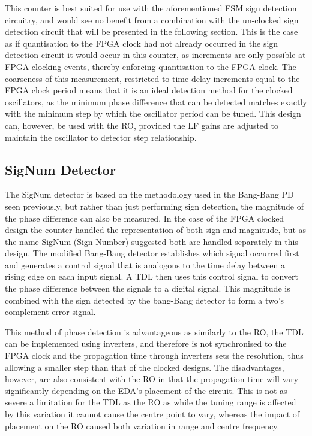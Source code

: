 This counter is best suited for use with the aforementioned \ac{FSM} sign detection circuitry, and would see no benefit from a combination with the un-clocked sign detection circuit that will be presented in the following section. This is the case as if quantisation to the \ac{FPGA} clock had not already occurred in the sign detection circuit it would occur in this counter, as increments are only possible at \ac{FPGA} clocking events, thereby enforcing quantisation to the \ac{FPGA} clock. The coarseness of this measurement, restricted to time delay increments equal to the \ac{FPGA} clock period means that it is an ideal detection method for the clocked oscillators, as the minimum phase difference that can be detected matches exactly with the minimum step by which the oscillator period can be tuned. This design can, however, be used with the \acl{RO}, provided the \acl{LF} gains are adjusted to maintain the oscillator to detector step relationship.

\subsection{SigNum Detector}
The SigNum detector is based on the methodology used in the Bang-Bang \acl{PD} seen previously, but rather than just performing sign detection, the magnitude of the phase difference can also be measured. In the case of the \ac{FPGA} clocked design the counter handled the representation of both sign and magnitude, but as the name SigNum (Sign Number) suggested both are handled separately in this design. The modified Bang-Bang detector establishes which signal occurred first and generates a control signal that is analogous to the time delay between a rising edge on each input signal. A \ac{TDL} then uses this control signal to convert the phase difference between the signals to a digital signal. This magnitude is combined with the sign detected by the bang-Bang detector to form a two's complement error signal.

This method of phase detection is advantageous as similarly to the \acl{RO}, the \ac{TDL} can be implemented using inverters, and therefore is not synchronised to the \ac{FPGA} clock and the propagation time through inverters sets the resolution, thus allowing a smaller step than that of the clocked designs. The disadvantages, however, are also consistent with the \ac{RO} in that the propagation time will vary significantly depending on the \ac{EDA}'s placement of the circuit. This is not as severe a limitation for the \ac{TDL} as the \ac{RO} as while the tuning range is affected by this variation it cannot cause the centre point to vary, whereas the impact of placement on the \ac{RO} caused both variation in range and centre frequency.


